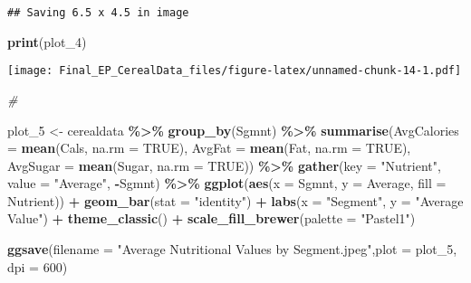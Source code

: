 \documentclass[
]{article}
\newenvironment{Shaded}{\begin{snugshade}}{\end{snugshade}}
\newcommand{\AttributeTok}[1]{\textcolor[rgb]{0.13,0.29,0.53}{#1}}
\newcommand{\CommentTok}[1]{\textcolor[rgb]{0.56,0.35,0.01}{\textit{#1}}}
\newcommand{\ConstantTok}[1]{\textcolor[rgb]{0.56,0.35,0.01}{#1}}
\newcommand{\DecValTok}[1]{\textcolor[rgb]{0.00,0.00,0.81}{#1}}
\newcommand{\FunctionTok}[1]{\textcolor[rgb]{0.13,0.29,0.53}{\textbf{#1}}}
\newcommand{\NormalTok}[1]{#1}
\newcommand{\OtherTok}[1]{\textcolor[rgb]{0.56,0.35,0.01}{#1}}
\newcommand{\SpecialCharTok}[1]{\textcolor[rgb]{0.81,0.36,0.00}{\textbf{#1}}}
\newcommand{\StringTok}[1]{\textcolor[rgb]{0.31,0.60,0.02}{#1}}
\begin{document}
\begin{verbatim}
## Saving 6.5 x 4.5 in image
\end{verbatim}

\begin{Shaded}
\begin{Highlighting}[]
\FunctionTok{print}\NormalTok{(plot\_4)}
\end{Highlighting}
\end{Shaded}

\texttt{[image: Final\_EP\_CerealData\_files/figure-latex/unnamed-chunk-14-1.pdf]}

\begin{Shaded}
\begin{Highlighting}[]
\CommentTok{\# }

\NormalTok{plot\_5 }\OtherTok{\textless{}{-}}\NormalTok{ cerealdata }\SpecialCharTok{\%\textgreater{}\%}
  \FunctionTok{group\_by}\NormalTok{(Sgmnt) }\SpecialCharTok{\%\textgreater{}\%}
  \FunctionTok{summarise}\NormalTok{(}\AttributeTok{AvgCalories =} \FunctionTok{mean}\NormalTok{(Cals, }\AttributeTok{na.rm =} \ConstantTok{TRUE}\NormalTok{),}
            \AttributeTok{AvgFat =} \FunctionTok{mean}\NormalTok{(Fat, }\AttributeTok{na.rm =} \ConstantTok{TRUE}\NormalTok{),}
            \AttributeTok{AvgSugar =} \FunctionTok{mean}\NormalTok{(Sugar, }\AttributeTok{na.rm =} \ConstantTok{TRUE}\NormalTok{)) }\SpecialCharTok{\%\textgreater{}\%}
  \FunctionTok{gather}\NormalTok{(}\AttributeTok{key =} \StringTok{"Nutrient"}\NormalTok{, }\AttributeTok{value =} \StringTok{"Average"}\NormalTok{, }\SpecialCharTok{{-}}\NormalTok{Sgmnt) }\SpecialCharTok{\%\textgreater{}\%}
  \FunctionTok{ggplot}\NormalTok{(}\FunctionTok{aes}\NormalTok{(}\AttributeTok{x =}\NormalTok{ Sgmnt, }\AttributeTok{y =}\NormalTok{ Average, }\AttributeTok{fill =}\NormalTok{ Nutrient)) }\SpecialCharTok{+}
  \FunctionTok{geom\_bar}\NormalTok{(}\AttributeTok{stat =} \StringTok{"identity"}\NormalTok{) }\SpecialCharTok{+}
  \FunctionTok{labs}\NormalTok{(}\AttributeTok{x =} \StringTok{"Segment"}\NormalTok{, }\AttributeTok{y =} \StringTok{"Average Value"}\NormalTok{) }\SpecialCharTok{+}
  \FunctionTok{theme\_classic}\NormalTok{() }\SpecialCharTok{+}
  \FunctionTok{scale\_fill\_brewer}\NormalTok{(}\AttributeTok{palette =} \StringTok{"Pastel1"}\NormalTok{)}


\FunctionTok{ggsave}\NormalTok{(}\AttributeTok{filename =} \StringTok{"Average Nutritional Values by Segment.jpeg"}\NormalTok{,}\AttributeTok{plot =}\NormalTok{ plot\_5, }\AttributeTok{dpi =} \DecValTok{600}\NormalTok{)}
\end{Highlighting}
\end{Shaded}
\end{document}
